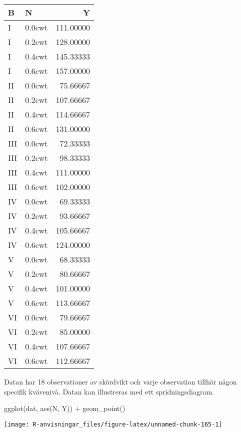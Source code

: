\documentclass[
]{book}
\newenvironment{Shaded}{\begin{snugshade}}{\end{snugshade}}
\newcommand{\FunctionTok}[1]{\textcolor[rgb]{0.00,0.00,0.00}{#1}}
\newcommand{\NormalTok}[1]{#1}
\newcommand{\SpecialCharTok}[1]{\textcolor[rgb]{0.00,0.00,0.00}{#1}}
\theoremstyle{definition}
\theoremstyle{definition}
\theoremstyle{definition}
\theoremstyle{definition}
\theoremstyle{remark}
\begin{document}
\begin{table}
\centering
\begin{tabular}[t]{llr}
\toprule
B & N & Y\\
\midrule
I & 0.0cwt & 111.00000\\
I & 0.2cwt & 128.00000\\
I & 0.4cwt & 145.33333\\
I & 0.6cwt & 157.00000\\
II & 0.0cwt & 75.66667\\
\addlinespace
II & 0.2cwt & 107.66667\\
II & 0.4cwt & 114.66667\\
II & 0.6cwt & 131.00000\\
III & 0.0cwt & 72.33333\\
III & 0.2cwt & 98.33333\\
\addlinespace
III & 0.4cwt & 111.00000\\
III & 0.6cwt & 102.00000\\
IV & 0.0cwt & 69.33333\\
IV & 0.2cwt & 93.66667\\
IV & 0.4cwt & 105.66667\\
\addlinespace
IV & 0.6cwt & 124.00000\\
V & 0.0cwt & 68.33333\\
V & 0.2cwt & 80.66667\\
V & 0.4cwt & 101.00000\\
V & 0.6cwt & 113.66667\\
\addlinespace
VI & 0.0cwt & 79.66667\\
VI & 0.2cwt & 85.00000\\
VI & 0.4cwt & 107.66667\\
VI & 0.6cwt & 112.66667\\
\bottomrule
\end{tabular}
\end{table}

Datan har 18 observationer av skördvikt och varje observation tillhör någon specifik kvävenivå. Datan kan illustreras med ett spridningsdiagram.

\begin{Shaded}
\begin{Highlighting}[]
\FunctionTok{ggplot}\NormalTok{(dat, }\FunctionTok{aes}\NormalTok{(N, Y)) }\SpecialCharTok{+}
  \FunctionTok{geom\_point}\NormalTok{()}
\end{Highlighting}
\end{Shaded}

\begin{center}\texttt{[image: R-anvisningar\_files/figure-latex/unnamed-chunk-165-1]} \end{center}
\end{document}

